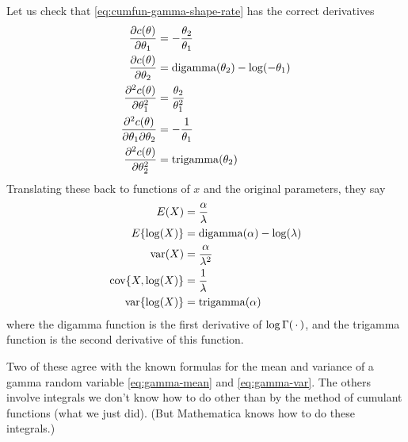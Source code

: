 Let us check that \eqref{eq:cumfun-gamma-shape-rate} has the correct
derivatives
\begin{align*}
   \frac{\partial c(\theta)}{\partial \theta_1}
   & =
   - \frac{\theta_2}{\theta_1}
   \\
   \frac{\partial c(\theta)}{\partial \theta_2}
   & =
   \operatorname{digamma}(\theta_2) - \log(- \theta_1)
   \\
   \frac{\partial^2 c(\theta)}{\partial \theta_1^2}
   & =
   \frac{\theta_2}{\theta_1^2}
   \\
   \frac{\partial^2 c(\theta)}{\partial \theta_1 \partial \theta_2}
   & =
   - \frac{1}{\theta_1}
   \\
   \frac{\partial^2 c(\theta)}{\partial \theta_2^2}
   & =
   \operatorname{trigamma}(\theta_2)
\end{align*}
Translating these back to functions of $x$ and the original parameters,
they say
\begin{align*}
   E(X) & = \frac{\alpha}{\lambda}
   \\
   E\{\log(X)\} & = \operatorname{digamma}(\alpha) - \log(\lambda)
   \\
   \operatorname{var}(X) & = \frac{\alpha}{\lambda^2}
   \\
   \operatorname{cov}\{X, \log(X)\} & = \frac{1}{\lambda}
   \\
   \operatorname{var}\{\log(X)\} & = \operatorname{trigamma}(\alpha)
\end{align*}
where the digamma function is the first derivative of $\log \Gamma(\,\cdot\,)$,
and the trigamma function is the second derivative of this function.

Two of these agree with the known formulas for the mean and variance
of a gamma random variable \eqref{eq:gamma-mean} and \eqref{eq:gamma-var}.
The others involve integrals we don't know how to do other than by
the method of cumulant functions (what we just did).
(But Mathematica knows how to do these integrals.)

